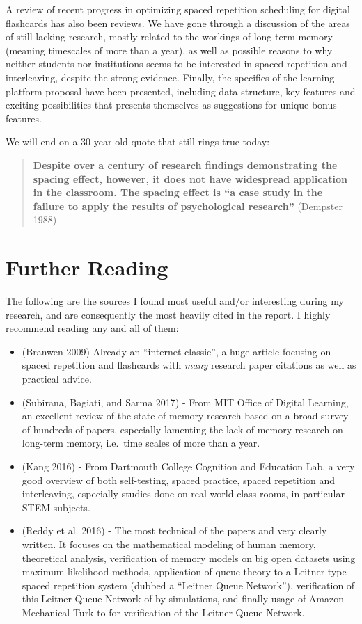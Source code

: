 A review of recent progress in optimizing spaced repetition scheduling
for digital flashcards has also been reviews. We have gone through a
discussion of the areas of still lacking research, mostly related to the
workings of long-term memory (meaning timescales of more than a year),
as well as possible reasons to why neither students nor institutions
seems to be interested in spaced repetition and interleaving, despite
the strong evidence. Finally, the specifics of the learning platform
proposal have been presented, including data structure, key features and
exciting possibilities that presents themselves as suggestions for
unique bonus features.

We will end on a 30-year old quote that still rings true today:

\begin{quote}
\textbf{Despite over a century of research findings demonstrating the
spacing effect, however, it does not have widespread application in the
classroom. The spacing effect is ``a case study in the failure to apply
the results of psychological research''} (Dempster 1988)
\end{quote}

\newpage

\section{Further Reading}\label{further-reading}

The following are the sources I found most useful and/or interesting
during my research, and are consequently the most heavily cited in the
report. I highly recommend reading any and all of them:

\begin{itemize}
\tightlist
\item
  (Branwen 2009) Already an ``internet classic'', a huge article
  focusing on spaced repetition and flashcards with \emph{many} research
  paper citations as well as practical advice.
\item
  (Subirana, Bagiati, and Sarma 2017) - From MIT Office of Digital
  Learning, an excellent review of the state of memory research based on
  a broad survey of hundreds of papers, especially lamenting the lack of
  memory research on long-term memory, i.e.~time scales of more than a
  year.
\item
  (Kang 2016) - From Dartmouth College Cognition and Education Lab, a
  very good overview of both self-testing, spaced practice, spaced
  repetition and interleaving, especially studies done on real-world
  class rooms, in particular STEM subjects.
\item
  (Reddy et al. 2016) - The most technical of the papers and very
  clearly written. It focuses on the mathematical modeling of human
  memory, theoretical analysis, verification of memory models on big
  open datasets using maximum likelihood methods, application of queue
  theory to a Leitner-type spaced repetition system (dubbed a ``Leitner
  Queue Network''), verification of this Leitner Queue Network of by
  simulations, and finally usage of Amazon Mechanical Turk to for
  verification of the Leitner Queue Network.
\end{itemize}

